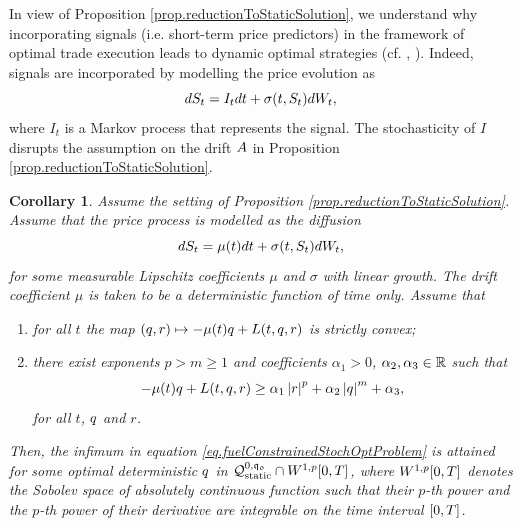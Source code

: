 \documentclass[10pt,a4paper]{article}
\newtheorem{corol}[thm]{Corollary}
{\theoremstyle{definition}{
	\newtheorem{remark}[thm]{Remark} 
	\newtheorem{example}[thm]{Example} 
	\newtheorem{exercise}[thm]{Exercise} 
}}}
\begin{document}
	\begin{remark}
		In view of Proposition \ref{prop.reductionToStaticSolution}, we understand why incorporating signals (i.e. short-term price predictors) in the framework of optimal trade execution leads to dynamic optimal strategies (cf. \cite{CJ16inc}, \cite{LN19inc}). Indeed, signals are incorporated by modelling the price evolution as \[
		dS_t = I_t dt + \sigma(t,S_t)dW_t,
		\]
		where $I_t$ is a Markov process that represents the signal. The stochasticity of $I$ disrupts the assumption on the drift $A$ in Proposition \ref{prop.reductionToStaticSolution}.
	\end{remark}
	
	
	


	\begin{corol}
		\label{corol.reductionToOptimalStatic}
		Assume the setting of Proposition \ref{prop.reductionToStaticSolution}. Assume that the  price  process is modelled as the diffusion 
		\begin{equation}\label{eq.SDEofFundamentalPrice}
				dS_t = \mu(t)dt +\sigma(t,S_t)dW_t,
		\end{equation}
		for some measurable Lipschitz coefficients $\mu$ and $\sigma$ with linear growth. The drift coefficient $\mu$ is taken to be a deterministic function of time only.
		Assume that  
		\begin{enumerate}
					\item for all $t$ the map $(q, r)\mapsto -\mu(t)q + L(t,q,r)$ is strictly convex;
					\item there exist exponents $p>m\geq 1$ and coefficients $\alpha_1>0$, $\alpha_2,\alpha_3 \in \mathbb{R}$ such that 
					\begin{equation*}
					-\mu(t)q + L(t,q, r) \geq \alpha_1 \left\lvert {r} \right\rvert^{p} + \alpha_2 \left\lvert {q} \right\rvert^m + \alpha_3,
					\end{equation*}
					for all $t$, $q$ and $r$. 
		\end{enumerate} 
	Then, the infimum in equation \eqref{eq.fuelConstrainedStochOptProblem} is attained for some optimal deterministic $q$ in $\mathcal{Q}_{\text{static}}^{0,\mathfrak{q_0}} \cap W^{1,p}{[0,T]}$, where $W^{1,p}{[0,T]}$ denotes the Sobolev space of absolutely continuous function such that their $p$-th power and the $p$-th power of their derivative are integrable on the time interval ${[0,T]}$. 
	\end{corol}
\end{document}
